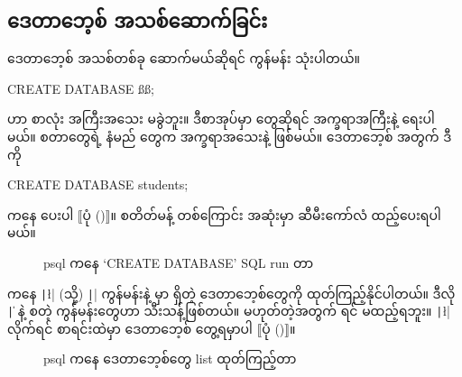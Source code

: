 \subsection*{ဒေတာဘေ့စ် အသစ်ဆောက်ခြင်း}
ဒေတာဘေ့စ် အသစ်တစ်ခု ဆောက်မယ်ဆိုရင်   ကွန်မန်း သုံးပါတယ်။  
%
\begin{sql}
CREATE DATABASE ßß;
\end{sql}
%
 ဟာ စာလုံး အကြီးအသေး မခွဲဘူး။ ဒီစာအုပ်မှာ  တွေဆိုရင် အက္ခရာအကြီးနဲ့ ရေးပါမယ်။  စတာတွေရဲ့ နံမည်  တွေက အက္ခရာအသေးနဲ့ ဖြစ်မယ်။
 ဒေတာဘေ့စ် အတွက် ဒီ  ကို
%
\begin{sql}
CREATE DATABASE students;
\end{sql}
%
 ကနေ  ပေးပါ $\big\llbracket$ပုံ (\fRefNo{\ref{fig:createdb}})$\big\rrbracket$။  စတိတ်မန့် တစ်ကြောင်း အဆုံးမှာ ဆီမီးကော်လံ \fEn{(\fCode{;})} ထည့်ပေးရပါမယ်။

\begin{figure}[tb!]
\caption{psql ကနေ ‘CREATE DATABASE’ SQL run တာ}
\label{fig:createdb}
\end{figure}

 ကနေ \texttt|\l| (သို့) \texttt|\list| ကွန်မန်းနဲ့  မှာ ရှိတဲ့ ဒေတာဘေ့စ်တွေကို ထုတ်ကြည့်နိုင်ပါတယ်။ ဒီလို \texttt|\|  နဲ့ စတဲ့ ကွန်မန်းတွေဟာ   သီးသန့်ဖြစ်တယ်။  မဟုတ်တဲ့အတွက်  ရင် \fCode{;} မထည့်ရဘူး။ \texttt|\l|  လိုက်ရင် စာရင်းထဲမှာ  ဒေတာဘေ့စ် တွေ့ရမှာပါ $\big\llbracket$ပုံ (\fRefNo{\ref{fig:listdb}})$\big\rrbracket$။

\begin{figure}[htb!]
\caption{psql ကနေ ဒေတာဘေ့စ်တွေ list ထုတ်ကြည့်တာ}
\label{fig:listdb}
\end{figure}

